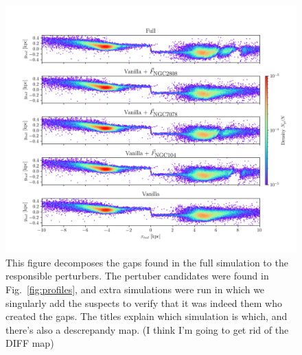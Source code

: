 \documentclass[draft]{aa}
\begin{document}
  \begin{figure}
    \centering
    \includegraphics[width=\linewidth]{decomposition-monte-carlo-009-with-3-gaps.png}
    \caption[]{This figure decomposes the gaps found in the full simulation to the responsible perturbers. The pertuber candidates were found in Fig.~\ref{fig:profiles}, and extra simulations were run in which we singularly add the suspects to verify that it was indeed them who created the gaps. The titles explain which simulation is which, and there's also a descrepandy map. (I think I'm going to get rid of the DIFF map)}
    \label{fig:decomposition}
    \end{figure}  


  
\end{document}
